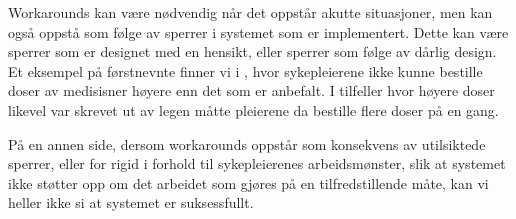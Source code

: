 \noindent
Workarounds kan være nødvendig når det oppstår akutte situasjoner, men kan også oppstå som følge av sperrer i systemet som er implementert. Dette kan være sperrer som er designet med en hensikt, eller sperrer som følge av dårlig design. Et eksempel på førstnevnte finner vi i \cite{Vogelsmeier08}, hvor sykepleierene ikke kunne bestille doser av medisisner høyere enn det som er anbefalt. I tilfeller hvor høyere doser likevel var skrevet ut av legen måtte pleierene da bestille flere doser på en gang.  

På en annen side, dersom workarounds oppstår som konsekvens av utilsiktede sperrer, eller for rigid i forhold til sykepleierenes arbeidsmønster, slik at systemet ikke støtter opp om det arbeidet som gjøres på en tilfredstillende måte, kan vi heller ikke si at systemet er suksessfullt.